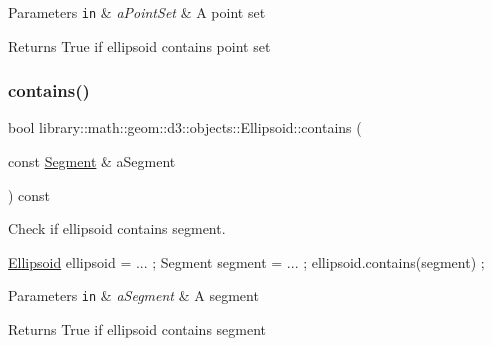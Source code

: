 \begin{DoxyParams}[1]{Parameters}
\mbox{\tt in}  & {\em a\+Point\+Set} & A point set \\
\hline
\end{DoxyParams}
\begin{DoxyReturn}{Returns}
True if ellipsoid contains point set 
\end{DoxyReturn}
\mbox{\label{classlibrary_1_1math_1_1geom_1_1d3_1_1objects_1_1_ellipsoid_a4b0c41a41fbd8f158da26825f04c47d5}} 
\subsubsection{\texorpdfstring{contains()}{contains()}\hspace{0.1cm}{\footnotesize\ttfamily [3/3]}}
{\footnotesize\ttfamily bool library\+::math\+::geom\+::d3\+::objects\+::\+Ellipsoid\+::contains (\begin{DoxyParamCaption}\item[{const \hyperlink{classlibrary_1_1math_1_1geom_1_1d3_1_1objects_1_1_segment}{Segment} \&}]{a\+Segment }\end{DoxyParamCaption}) const}



Check if ellipsoid contains segment. 


\begin{DoxyCode}
\hyperlink{classlibrary_1_1math_1_1geom_1_1d3_1_1objects_1_1_ellipsoid_aae81fe0edc7f0e8d4590ea89ae73cb14}{Ellipsoid} ellipsoid = ... ;
Segment segment = ... ;
ellipsoid.contains(segment) ;
\end{DoxyCode}



\begin{DoxyParams}[1]{Parameters}
\mbox{\tt in}  & {\em a\+Segment} & A segment \\
\hline
\end{DoxyParams}
\begin{DoxyReturn}{Returns}
True if ellipsoid contains segment 
\end{DoxyReturn}
\mbox{\label{classlibrary_1_1math_1_1geom_1_1d3_1_1objects_1_1_ellipsoid_a646be2506950d250db0fb6610979bb46}} 
